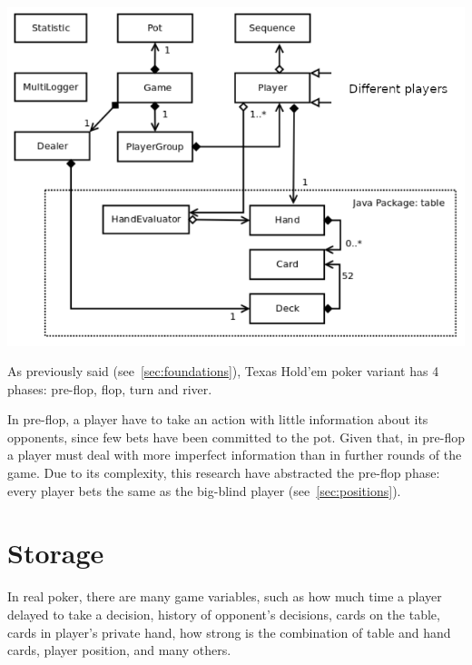 \vspace{1cm}
\includegraphics[scale=2]{simulation-diagram}

As previously said (see~\ref{sec:foundations}), Texas Hold'em poker variant has 4 phases: pre-flop, flop, turn and river.

In pre-flop, a player have to take an action with little information about its opponents, since few bets have been committed to the pot. Given that, in pre-flop a player must deal with more imperfect information than in further rounds of the game. Due to its complexity, this research have abstracted the pre-flop phase: every player bets the same as the big-blind player (see~\ref{sec:positions}).

\section{Storage}
\label{sec:storage}

In real poker, there are many game variables, such as how much time a player delayed to take a decision, history of opponent’s decisions, cards on the table, cards in player’s private hand, how strong is the combination of table and hand cards, player position, and many others.

